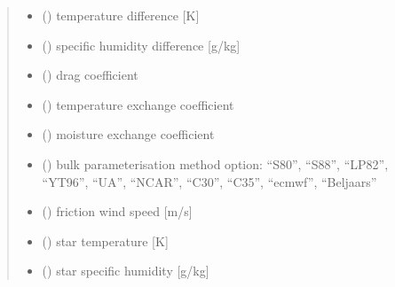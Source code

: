 \documentclass[letterpaper,10pt,english]{sphinxmanual}
\begin{document}
\begin{fulllineitems}
\begin{quote}
\begin{description}
\begin{itemize}
\item {}
\sphinxAtStartPar
{} () \textendash{} temperature difference       {[}K{]}

\item {}
\sphinxAtStartPar
{} () \textendash{} specific humidity difference {[}g/kg{]}

\item {}
\sphinxAtStartPar
{} () \textendash{} drag coefficient

\item {}
\sphinxAtStartPar
{} () \textendash{} temperature exchange coefficient

\item {}
\sphinxAtStartPar
{} () \textendash{} moisture exchange coefficient

\item {}
\sphinxAtStartPar
{} () \textendash{} bulk parameterisation method option: “S80”, “S88”, “LP82”, “YT96”,
“UA”, “NCAR”, “C30”, “C35”, “ecmwf”, “Beljaars”

\end{itemize}

\sphinxAtStartPar
\begin{itemize}
\item {}
\sphinxAtStartPar
{} () \textendash{} friction wind speed {[}m/s{]}

\item {}
\sphinxAtStartPar
{} () \textendash{} star temperature    {[}K{]}

\item {}
\sphinxAtStartPar
{} () \textendash{} star specific humidity {[}g/kg{]}

\end{itemize}


\end{description}\end{quote}

\end{fulllineitems}
\end{document}
